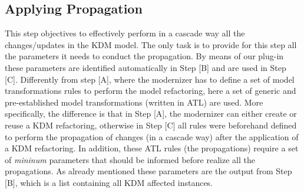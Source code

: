 


\subsection{Applying Propagation} %
\label{sub:apply_refactoring}

This step objectives to effectively perform in a cascade way all the changes/updates in the KDM model. 
%
The only task is to provide for this step all the parameters it needs to conduct the propagation. By means of our plug-in these parameters are identified automatically in Step [B] and are used in Step [C]. 
%
%
Differently from step [A], where the modernizer has to define a set of model transformations rules to perform the model refactoring, here a set of generic and pre-established model transformations (written in ATL) are used. More specifically, the difference is that in Step [A], the modernizer can either create or reuse a KDM refactoring, otherwise in Step [C] all rules were beforehand defined to perform the propagation of changes (in a cascade way) after the application of a KDM refactoring. In addition, these ATL rules (the propagations) require a set of  \textit{mininum} parameters that should be informed before realize all the propagations. As already mentioned these parameters are the output from Step [B], which is a list containing all KDM affected instances. 

